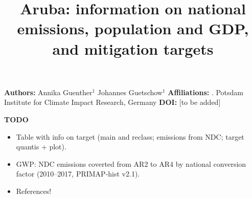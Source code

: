 \documentclass[12pt]{article}
\title{ \bfseries \color{PIKorange} Aruba: information on national emissions, population and GDP, and mitigation targets}
\begin{document}
 \maketitle

 \noindent \textbf{Authors:} \newline
 \indent Annika Guenther$^{1}$ \newline
 \indent Johannes Guetschow$^{1}$ \newline
 \noindent \textbf{Affiliations:} \newline
 . Potsdam Institute for Climate Impact Research, Germany \newline
 \noindent \textbf{DOI:} [to be added] \newline

 \textbf{TODO}
 \begin{itemize}
 \item Table with info on target (main and reclass; emissions from NDC; target quantis + plot).
 \item GWP: NDC emissions coverted from AR2 to AR4 by national conversion factor (2010--2017, PRIMAP-hist v2.1).
 \item References!
 \end{itemize}

\end{document}
